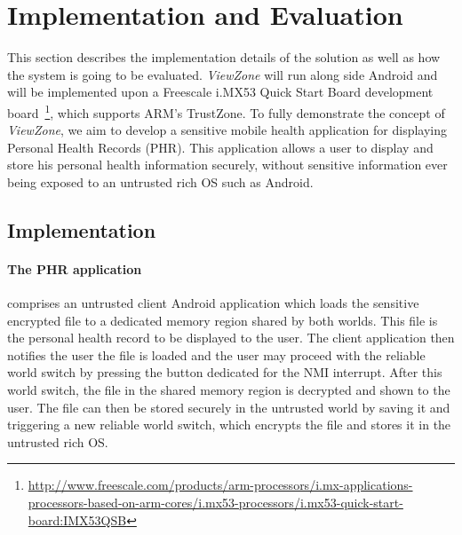 
% 
% 
\section{Implementation and Evaluation}
\label{sec:evaluation}

This section describes the implementation details of the solution as well as how the system is going to be evaluated. \emph{ViewZone} will run along side Android and will be implemented upon a Freescale i.MX53 Quick Start Board development board~\footnote{\url{http://www.freescale.com/products/arm-processors/i.mx-applications-processors-based-on-arm-cores/i.mx53-processors/i.mx53-quick-start-board:IMX53QSB}}, which supports ARM's TrustZone. To fully demonstrate the concept of \emph{ViewZone}, we aim to develop a sensitive mobile health application for displaying Personal Health Records (PHR). This application allows a user to display and store his personal health information securely, without sensitive information ever being exposed to an untrusted rich OS such as Android.

\subsection{Implementation}

\paragraph{The \ac{PHR} application} comprises an untrusted client Android application which loads the sensitive encrypted file to a dedicated memory region shared by both worlds. This file is the personal health record to be displayed to the user. The client application then notifies the user the file is loaded and the user may proceed with the reliable world switch by pressing the button dedicated for the \ac{NMI} interrupt. After this world switch, the file in the shared memory region is decrypted and shown to the user. The file can then be stored securely in the untrusted world by saving it and triggering a new reliable world switch, which encrypts the file and stores it in the untrusted rich OS.

